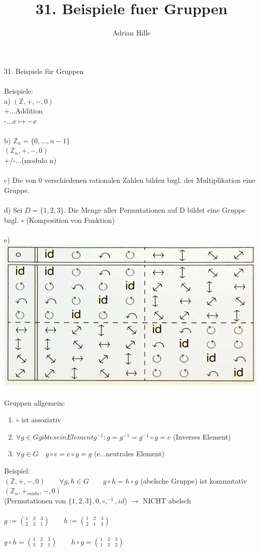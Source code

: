 \documentclass{scrartcl}
\title{31. Beispiele fuer Gruppen}
\author{Adrian Hille}
\begin{document}
\Large 31. Beispiele f\"ur Gruppen\\
\\
\normalsize
Beispiele:\\
a) $(\mathbb{Z}, +, -, 0)$\\
+...Addition\\
-...$x \mapsto -x$\\
\\
b) $\mathbb{Z}_n = \{0,..., n-1\}$\\
$(\mathbb{Z}_n, +, -, 0)$\\
+/-...(modulo n)\\
\\
c) Die von 0 verschiedenen rationalen Zahlen bilden bzgl. der Multiplikation eine Gruppe.\\
\\
d) Sei $D= \{1, 2, 3\}$.  Die Menge aller Permutationen auf D bildet eine Gruppe bzgl. $\circ$ (Komposition von Funktion)\\
\\
e)\\
\includegraphics{Symmetrien.png}
\\
\\
\large Gruppen allgemein:
\normalsize
\begin{enumerate}
	\item $\circ$ ist assoziativ
	\item $\forall g \in G gibt es ein Element g^{-1}: g = g^{-1} = g^{-1} \circ g = e$ (Inverses Element)
	\item $\forall g \in G \quad g \circ e = e \circ g = g$ (e...neutrales Element)
\end{enumerate}

Beispiel:\\
$(\mathbb{Z}, +, -, 0) \qquad \forall g,h \in G \qquad g \circ h = h \circ g$ (abelsche Gruppe) ist kommutativ\\
$(\mathbb{Z}_n, +_{mod n}, -, 0)$\\
(Permutationen von $\{1, 2, 3\}, 0, \circ, ^{-1}, id$) $\to$ NICHT abelsch\\\\
$g := \binom{1 \quad 2 \quad 3}{2 \quad 3 \quad 1} \qquad h:= \binom{1 \quad 2 \quad 3}{2 \quad 1 \quad 3} $\\\\
$g \circ h = \binom{1 \quad 2 \quad 3}{3 \quad 2 \quad 1} \qquad h \circ g = \binom{1 \quad 2 \quad 3}{1 \quad 3 \quad 2}$\\\\
\end{document}
